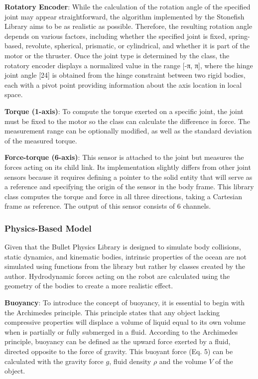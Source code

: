 \documentclass[]{article}
\begin{document}
		\textbf{Rotatory Encoder}: While the calculation of the rotation angle of the specified joint may appear straightforward, the algorithm implemented by the Stonefish Library aims to be as realistic as possible. Therefore, the resulting rotation angle depends on various factors, including whether the specified joint is fixed, spring-based, revolute, spherical, prismatic, or cylindrical, and whether it is part of the motor or the thruster. Once the joint type is determined by the class, the rotatory encoder displays a normalized value in the range [-π, π], where the hinge joint angle [24] is obtained from the hinge constraint between two rigid bodies, each with a pivot point providing information about the axis location in local space.
		
		\textbf{Torque (1-axis)}: To compute the torque exerted on a specific joint, the joint must be fixed to the motor so the class can calculate the difference in force. The measurement range can be optionally modified, as well as the standard deviation of the measured torque.
		
		\textbf{Force-torque (6-axis)}: This sensor is attached to the joint but measures the forces acting on its child link. Its implementation slightly differs from other joint sensors because it requires defining a pointer to the solid entity that will serve as a reference and specifying the origin of the sensor in the body frame. This library class computes the torque and force in all three directions, taking a Cartesian frame as reference. The output of this sensor consists of 6 channels.
		
		\subsubsection{Physics-Based Model}
		
		Given that the Bullet Physics Library is designed to simulate body collisions, static dynamics, and kinematic bodies, intrinsic properties of the ocean are not simulated using functions from the library but rather by classes created by the author. Hydrodynamic forces acting on the robot are calculated using the geometry of the bodies to create a more realistic effect.
		
		\textbf{Buoyancy}: To introduce the concept of buoyancy, it is essential to begin with the Archimedes principle. This principle states that any object lacking compressive properties will displace a volume of liquid equal to its own volume when is partially or fully submerged in a fluid. According to the Archimedes principle, buoyancy can be defined as the upward force exerted by a fluid, directed opposite to the force of gravity. This buoyant force (Eq. 5) can be calculated with the gravity force $g$, fluid density $\rho$ and the volume $V$ of the object.
		
\end{document}
